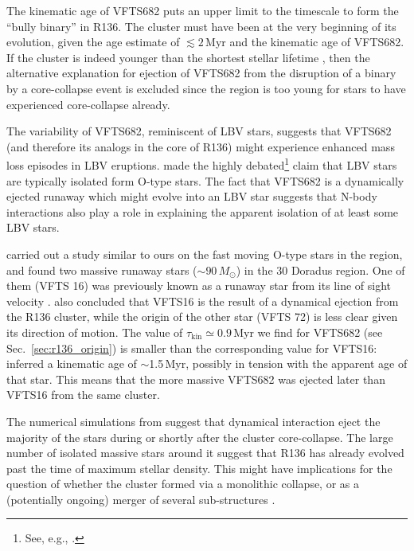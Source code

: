 \documentclass[apjl,twocolumn]{emulateapj}
\DeclareRobustCommand{\Secref}[1]{Sec.~\ref{#1}}
\begin{document}
The kinematic age of VFTS682 puts an
upper limit to the timescale to form the ``bully binary'' in
R136. The cluster must have been at the very beginning of its
evolution, given the age estimate of $\lesssim 2$\,Myr
\citep[][]{crowther:10,sabbi:12} and the kinematic age of VFTS682. If the
cluster is indeed younger than the shortest stellar lifetime
\citep[$\sim$3\,Myr, e.g.,][]{brott:11, zapartas:17}, then the alternative
explanation for ejection of VFTS682 from the disruption of a binary
by a core-collapse event is excluded since the region is too young for stars
to have experienced core-collapse already.

The variability of VFTS682, reminiscent of LBV stars, suggests
that VFTS682 (and therefore its analogs in the core of R136) might
experience enhanced mass loss episodes in LBV eruptions. \citet{smith:15} made the highly
debated\footnote{See, e.g., \cite{humphreys:16, davidson:16, smith:16}.}
claim that LBV stars are typically isolated form O-type stars. The fact that VFTS682 is a dynamically
ejected runaway which might evolve into an LBV star suggests that
N-body interactions also play a role in explaining the apparent
isolation of at least some LBV stars. 


\citet{lennon:18} carried out a study similar to ours on the fast
moving O-type stars
in the region, and found two massive runaway stars
($\sim$$90\,M_\odot$) in the 30 Doradus region. One of them (VFTS 16)
was previously known as a runaway star from its line of sight velocity
\citep[][]{evans:10}. \citet{lennon:18} also concluded that VFTS16 is 
the result of a dynamical ejection from the R136 cluster, while the
origin of the other star (VFTS 72) is less clear given its direction
of motion. The value of $\tau_\mathrm{kin}\simeq0.9$\,Myr we find for
VFTS682 (see \Secref{sec:r136_origin}) is smaller than the
corresponding value for VFTS16: \cite{lennon:18} inferred a kinematic
age of $\sim$1.5\,Myr, possibly in tension with the apparent age of that star. This means that the more
massive VFTS682 was ejected later than VFTS16 from the same cluster.

The numerical simulations from \cite{oh:16} suggest that dynamical
interaction eject the majority of the stars during or shortly after the cluster
core-collapse. The large number of isolated massive stars around it
suggest that R136 has already evolved past the
time of maximum stellar density. This might have implications for the
question of whether the cluster formed via a monolithic collapse, or
as a (potentially ongoing) merger of several sub-structures \citep[e.g.,][]{sabbi:12}.
\end{document}
